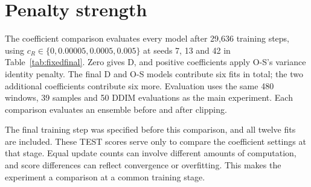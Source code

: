 \documentclass{article}
\begin{document}
\section{Penalty strength}
\label{app:fixedfinal}

The coefficient comparison evaluates every model after 29{,}636 training steps, using $c_R\in\{0,0.00005,0.0005,0.005\}$ at seeds 7, 13 and 42 in Table~\ref{tab:fixedfinal}. Zero gives D, and positive coefficients apply O-S's variance identity penalty. The final D and O-S models contribute six fits in total; the two additional coefficients contribute six more. Evaluation uses the same 480 windows, 39 samples and 50 DDIM evaluations as the main experiment. Each comparison evaluates an ensemble before and after clipping.

The final training step was specified before this comparison, and all twelve fits are included. These TEST scores serve only to compare the coefficient settings at that stage. Equal update counts can involve different amounts of computation, and score differences can reflect convergence or overfitting. This makes the experiment a comparison at a common training stage.
\end{document}
